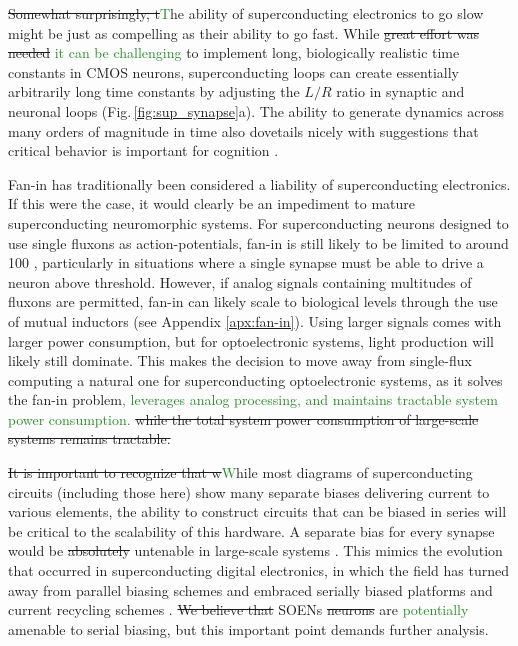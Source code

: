 \documentclass[twocolumn]{article}
\begin{document}
\sout{Somewhat surprisingly, t}\textcolor{ForestGreen}{T}he ability of superconducting electronics to go slow might be just as compelling as their ability to go fast. While \sout{great effort was needed} \textcolor{ForestGreen}{it can be challenging} to implement long, biologically realistic time constants in CMOS neurons, superconducting loops can create essentially arbitrarily long time constants by adjusting the $L/R$ ratio in synaptic and neuronal loops (Fig.\,\ref{fig:sup_synapse}a). The ability to generate dynamics across many orders of magnitude in time also dovetails nicely with suggestions that critical behavior is important for cognition \cite{cocchi2017criticality}. 

Fan-in has traditionally been considered a liability of superconducting electronics. If this were the case, it would clearly be an impediment to mature superconducting neuromorphic systems. For superconducting neurons designed to use single fluxons as action-potentials, fan-in is still likely to be limited to around 100 \cite{schneider2020fan}, particularly in situations where a single synapse must be able to drive a neuron above threshold. However, if analog signals containing multitudes of fluxons are permitted, fan-in can likely scale to biological levels through the use of mutual inductors (see Appendix \ref{apx:fan-in}). Using larger signals comes with larger power consumption, but for optoelectronic systems, light production will likely still dominate. This makes the decision to move away from single-flux computing a natural one for superconducting optoelectronic systems, as it solves the fan-in problem\textcolor{ForestGreen}{, leverages analog processing, and maintains tractable system power consumption.} \sout{while the total system power consumption of large-scale systems remains tractable.}

\sout{It is important to recognize that w}\textcolor{ForestGreen}{W}hile most diagrams of superconducting circuits (including those here) show many separate biases delivering current to various elements, the ability to construct circuits that can be biased in series will be critical to the scalability of this hardware. A separate bias for every synapse would be \sout{absolutely} untenable in large-scale systems \cite{sergey}. This mimics the evolution that occurred in superconducting digital electronics, in which the field has turned away from parallel biasing schemes and embraced serially biased platforms \cite{tolpygo2016superconductor} and current recycling schemes \cite{kisa2011}. \sout{We believe that }SOENs \sout{neurons} are \textcolor{ForestGreen}{potentially} amenable to serial biasing, but this important point demands further analysis.
\end{document}
